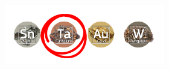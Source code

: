 \documentclass[a4paper,11pt]{article}
\title{
  \includegraphics[width=7cm]{images/banner-minerals}\\[\bigskipamount]
  \documenttitle\\[\bigskipamount]
}
\author{\documentauthors}
\date{\parbox{\linewidth}{\centering%
  Datum \documentdate\endgraf
}}
\begin{document}
\maketitle\thispagestyle{empty}\newpage

\begin{abstract}
  
          \newpage
\end{abstract}










\end{document}
